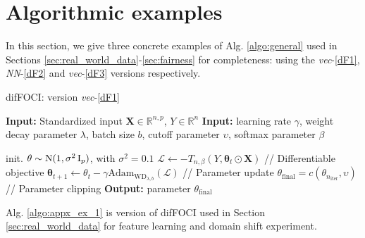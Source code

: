\newpage


\section{Algorithmic examples}
\label{appx:sec_H}


In this section, we give three concrete examples of Alg. \ref{algo:general} used in Sections \ref{sec:real_world_data}-\ref{sec:fairness} for completeness: using the \textit{vec}-\ref{dF1}, \textit{NN}-\ref{dF2} and \textit{vec}-\ref{dF3} versions respectively.

\begin{algorithm}[ht]
\caption{difFOCI: version \textit{vec}-\ref{dF1}}
\begin{algorithmic}
\STATE \textbf{Input:} Standardized input $\mathbf{X}\in\mathbb{R}^{n,p}$, $Y\in\mathbb{R}^n$ 
\STATE \textbf{Input:} learning rate $\gamma$, weight decay parameter $\lambda$, batch size $b$, cutoff parameter $\upsilon$, softmax parameter $\beta$

\STATE init. $\theta\sim \mathrm{N}(1, \sigma^2\operatorname{I}_p)$, with $\sigma^2=0.1$ 
    \STATE $\mathcal{L} \gets -T_{n, \beta}(Y, \mathbf{\theta}_t\odot \mathbf{X})$ \hfill // Differentiable objective
    \STATE $\mathbf{\theta}_{t+1} \gets \theta_t - \gamma \text{Adam}_{\text{WD}_{\lambda, b}} (\mathcal{L})$   \hfill // Parameter update
\ENDFOR
\STATE $\theta_{\text{final}} = c(\theta_{n_{\text{iter}}}, \upsilon)$ \hfill // Parameter clipping
\STATE \textbf{Output:} parameter $\theta_{\text{final}}$
\end{algorithmic}
\label{algo:appx_ex_1}
\end{algorithm}

Alg. \ref{algo:appx_ex_1} is version of difFOCI used in Section \ref{sec:real_world_data} for feature learning and domain shift experiment.

